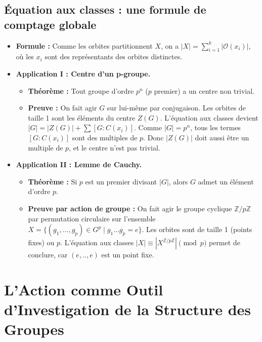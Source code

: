 \documentclass[12pt, a4paper, parskip=full]{report}
\theoremstyle{agregstyle}
\begin{document}
\subsection{Équation aux classes : une formule de comptage globale}
\begin{itemize}
    \item \textbf{Formule :} Comme les orbites partitionnent $X$, on a $|X| = \sum_{i=1}^k |\mathcal{O}(x_i)|$, où les $x_i$ sont des représentants des orbites distinctes.
    \item \textbf{Application I : Centre d'un p-groupe.}
        \begin{itemize}
            \item \textbf{Théorème :} Tout groupe d'ordre $p^n$ ($p$ premier) a un centre non trivial.
            \item \textbf{Preuve :} On fait agir $G$ sur lui-même par conjugaison. Les orbites de taille 1 sont les éléments du centre $Z(G)$. L'équation aux classes devient $|G| = |Z(G)| + \sum [G:C(x_i)]$. Comme $|G|=p^n$, tous les termes $[G:C(x_i)]$ sont des multiples de $p$. Donc $|Z(G)|$ doit aussi être un multiple de $p$, et le centre n'est pas trivial.
        \end{itemize}
    \item \textbf{Application II : Lemme de Cauchy.}
        \begin{itemize}
            \item \textbf{Théorème :} Si $p$ est un premier divisant $|G|$, alors $G$ admet un élément d'ordre $p$.
            \item \textbf{Preuve par action de groupe :} On fait agir le groupe cyclique $\mathbb{Z}/p\mathbb{Z}$ par permutation circulaire sur l'ensemble $X = \{ (g_1, \dots, g_p) \in G^p \mid g_1 \dots g_p = e \}$. Les orbites sont de taille 1 (points fixes) ou $p$. L'équation aux classes $|X| \equiv |X^{\mathbb{Z}/p\mathbb{Z}}| \pmod p$ permet de conclure, car $(e,..,e)$ est un point fixe.
        \end{itemize}
\end{itemize}

\section{L'Action comme Outil d'Investigation de la Structure des Groupes}
\end{document}
